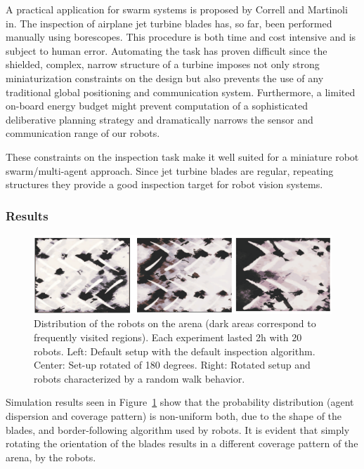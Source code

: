 \documentclass[Main.tex]{subfiles}
\begin{document}
A practical application for swarm systems is proposed by Correll and Martinoli in\cite{Correll2006, Correll2007}. The inspection of airplane jet turbine blades has, so far, been performed manually using borescopes. This procedure is both time and cost intensive and is subject to human error. Automating the task has proven difficult since the shielded, complex, narrow structure of a turbine imposes not only strong miniaturization constraints on the design but also prevents the use of any traditional global positioning and communication system. Furthermore, a limited on-board energy budget might prevent computation of a sophisticated deliberative planning strategy and dramatically narrows the sensor and communication range of our robots.~\cite{Correll2006}

These constraints on the inspection task make it well suited for a miniature robot swarm/multi-agent approach. Since jet turbine blades are regular, repeating structures they provide a good inspection target for robot vision systems.

\subsubsection*{Results}
\begin{figure}[!htb]
\centering\includegraphics[width=.75\textwidth]{bladeDist.png}
\caption{Distribution of the robots on the arena (dark areas correspond to frequently visited regions). Each experiment lasted 2h with 20 robots. Left: Default setup with the default inspection algorithm. Center: Set-up rotated of 180 degrees. Right: Rotated setup and robots characterized by a random walk behavior.}\label{fig:bladedist}
\end{figure}

Simulation results seen in Figure~\ref{fig:bladedist} show that the probability distribution (agent dispersion and coverage pattern) is non-uniform both, due to the shape of the blades, and border-following algorithm used by robots. It is evident that simply rotating the orientation of the blades results in a different coverage pattern of the arena, by the robots.
\end{document}
